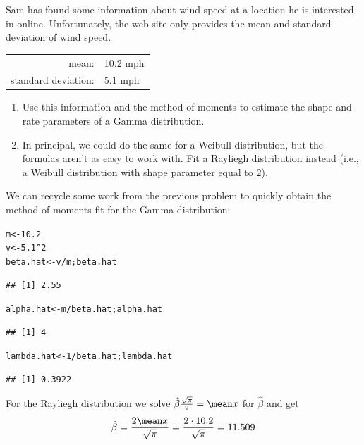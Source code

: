 \documentclass[twoside]{book}\usepackage[]{graphicx}\usepackage[]{xcolor}
\makeatletter
\newcommand{\hlnum}[1]{\textcolor[rgb]{0.686,0.059,0.569}{#1}}%
\newcommand{\hlopt}[1]{\textcolor[rgb]{0,0,0}{#1}}%
\newcommand{\hlstd}[1]{\textcolor[rgb]{0.345,0.345,0.345}{#1}}%
\newcommand{\hlkwb}[1]{\textcolor[rgb]{0.69,0.353,0.396}{#1}}%
\newenvironment{kframe}{%
 \def\at@end@of@kframe{}%
 \ifinner\ifhmode%
  \def\at@end@of@kframe{\end{minipage}}%
  \begin{minipage}{\columnwidth}%
 \fi\fi%
 \def\FrameCommand##1{\hskip\@totalleftmargin \hskip-\fboxsep
 \colorbox{shadecolor}{##1}\hskip-\fboxsep
     \hskip-\linewidth \hskip-\@totalleftmargin \hskip\columnwidth}%
 \MakeFramed {\advance\hsize-\width
   \@totalleftmargin\z@ \linewidth\hsize
   \@setminipage}}%
 {\par\unskip\endMakeFramed%
 \at@end@of@kframe}
\newenvironment{knitrout}{}{} %
\makeatother
\begin{document}
\begin{problem}
	Sam has found some information about wind speed at a location he
	is interested in online.  Unfortunately, the web site only provides
	the mean and standard deviation of wind speed.  
	\begin{center}
		\begin{tabular}{rl}
			mean: &  10.2 mph
			\\
			standard deviation: & 5.1 mph
		\end{tabular}
	\end{center}
	\begin{enumerate}
		\item
	Use this information and the method of moments to estimate the 
	shape and rate parameters of a Gamma distribution.
\item	
	In principal, we could do the same for a Weibull distribution, but the 
	formulas aren't as easy to work with. 
	Fit a Rayliegh distribution instead (i.e., a Weibull
	distribution with shape parameter equal to 2).
	\end{enumerate}
\end{problem}

\begin{solution}
We can recycle some work from the previous problem to quickly obtain
the method of moments fit for the Gamma distribution:
\begin{knitrout}
\color{fgcolor}\begin{kframe}
\begin{alltt}
\hlstd{m} \hlkwb{<-} \hlnum{10.2}
\hlstd{v} \hlkwb{<-} \hlnum{5.1}\hlopt{^}\hlnum{2}
\hlstd{beta.hat} \hlkwb{<-} \hlstd{v}\hlopt{/}\hlstd{m; beta.hat}
\end{alltt}
\begin{verbatim}
## [1] 2.55
\end{verbatim}
\begin{alltt}
\hlstd{alpha.hat} \hlkwb{<-} \hlstd{m} \hlopt{/} \hlstd{beta.hat ; alpha.hat}
\end{alltt}
\begin{verbatim}
## [1] 4
\end{verbatim}
\begin{alltt}
\hlstd{lambda.hat} \hlkwb{<-} \hlnum{1}\hlopt{/} \hlstd{beta.hat ; lambda.hat}
\end{alltt}
\begin{verbatim}
## [1] 0.3922
\end{verbatim}
\end{kframe}
\end{knitrout}
For the Rayliegh distribution we solve 
	\(
	\hat \beta \frac{\sqrt{\pi}}{2} = \mean x  
	\) for 
	\(\hat \beta\) and get
	\[
	\hat\beta = \frac{2 \mean x }{\sqrt{\pi}}
	= \frac{2 \cdot 10.2 }{\sqrt{\pi}}
	= 11.509
	\]	
\end{solution}
\end{document}
